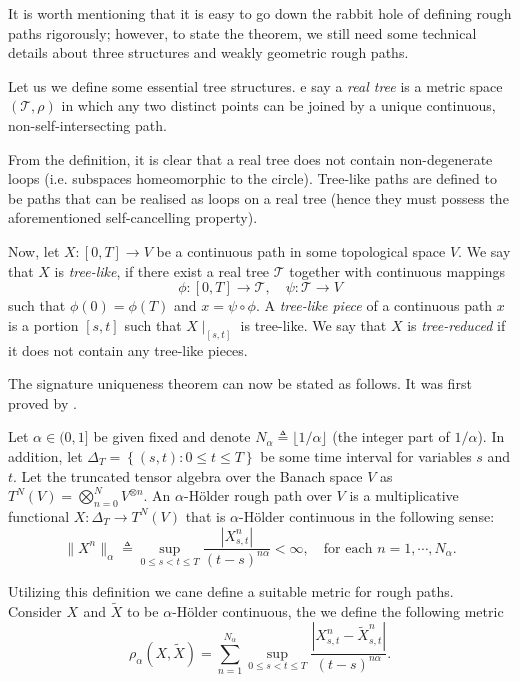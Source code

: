 It is worth mentioning that it is easy to go down the rabbit hole of defining rough paths rigorously; however, to state the theorem, we still need some technical details about three structures and weakly geometric rough paths.

Let us we define some essential tree structures.
e say a \textit{real tree} is a metric space $(\mathcal{T}, \rho)$ in which any two distinct points can be joined by a unique continuous, non-self-intersecting path.

From the definition, it is clear that a real tree does not contain non-degenerate loops (i.e. subspaces homeomorphic to the circle). Tree-like paths are defined to be paths that can be realised as loops on a real tree (hence they must possess the aforementioned self-cancelling property).


Now, let $X : [0, T] \to V$ be a continuous path in some topological space $V$. We say that $X$ is \textit{tree-like}, if there exist a real tree $\mathcal{T}$ together with continuous mappings
\[
\phi : [0, T] \to \mathcal{T}, \quad \psi : \mathcal{T} \to V
\]
such that $\phi(0) = \phi(T)$ and $x = \psi \circ \phi$. A \textit{tree-like piece} of a continuous path $x$ is a portion $[s, t]$ such that $X\mid_{[s,t]}$ is tree-like. We say that $X$ is \textit{tree-reduced} if it does not contain any tree-like pieces.


The signature uniqueness theorem can now be stated as follows. It was first
proved by \cite{boedihardjo2016signature}.


Let $\alpha \in (0,1]$ be given fixed and denote $N_{\alpha} \triangleq \lfloor 1/\alpha \rfloor$ (the integer part of $1/\alpha$). In addition, let $\Delta _{T} = \left\{ ( s,t) : 0 \le t \le T \right\} $ be some time interval for variables $s $
and $t$. Let the truncated tensor algebra over the Banach space $V$ as $T^{N}( V) = \bigotimes_{n= 0} ^{N} V^{ \otimes n}  $.     An $\alpha$-Hölder rough path over $V$ is a multiplicative functional $X : \Delta_T \to T_{}^N(V)$ that is $\alpha$-Hölder continuous in the following sense:
\[
\|X^n\|_{\alpha} \triangleq \sup_{0 \leq s < t \leq T} \frac{|X_{s,t}^n|}{(t-s)^{n\alpha}} < \infty, \quad \text{for each } n = 1, \cdots, N_{\alpha}.
\]

Utilizing this definition we cane define a suitable metric for rough paths. Consider $X_{}$ and $\widetilde{X}$ to be $\alpha$-Hölder continuous, the we define the following metric \begin{equation}
\rho _{\alpha }( X, \widetilde{X})  = \sum_{n=1}^{N_{\alpha }} \sup_{0 \le s < t \le T  } \frac{| X_{s,t}^{n} - \widetilde{X}_{s,t}^{n}  |   }{( t -s)^{n\alpha } }.
\end{equation}

